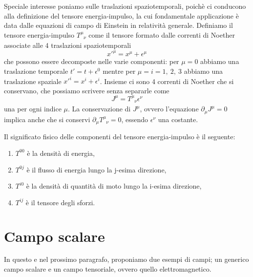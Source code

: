     Speciale interesse poniamo sulle traslazioni spaziotemporali, poichè ci conducono alla definizione del tensore energia-impulso, la cui fondamentale applicazione è data dalle equazioni di campo di Einstein in relatività generale. 
    Definiamo il tensore energia-impulso $T^\mu_{\phantom \mu \nu}$ come il tensore formato dalle correnti di Noether associate alle 4 traslazioni spaziotemporali
    \begin{equation*}
        x'^\mu = x^\mu + \epsilon^\mu
    \end{equation*}
    che possono essere decomposte nelle varie componenti: per $\mu=0$ abbiamo una traslazione temporale $t' = t + \epsilon^0$ mentre per $\mu=i=1,~2,~3$ abbiamo una traslazione spaziale $x'^i = x^i + \epsilon^i$. Insieme ci sono 4 correnti di Noether che si conservano, che possiamo scrivere senza separarle come 
    \begin{equation} \label{tensenimp}
        J^\mu = T^\mu_{\phantom \mu \nu} \epsilon^\nu
    \end{equation}
    una per ogni indice $\mu$. La conservazione di $J^\mu$, ovvero l'equazione $\partial_\mu J^\mu = 0 $ implica anche che si conservi $\partial_\mu T^\mu_{\phantom \mu \nu} = 0$, essendo $\epsilon^\nu$ una costante.

    Il significato fisico delle componenti del tensore energia-impulso è il seguente: 
    \begin{enumerate}
        \item $T^{00}$ è la densità di energia,
        \item $T^{0j}$ è il flusso di energia lungo la j-esima direzione,
        \item $T^{i0}$ è la densità di quantità di moto lungo la i-esima direzione,
        \item $T^{ij}$ è il tensore degli sforzi.
    \end{enumerate}

\section{Campo scalare}

    In questo e nel prossimo paragrafo, proponiamo due esempi di campi; un generico campo scalare e un campo tensoriale, ovvero quello elettromagnetico.

    \hfill


